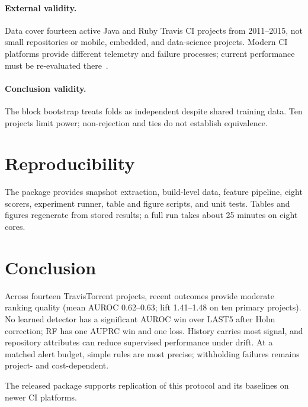 \documentclass[sigconf,review,anonymous,nonacm]{acmart}
\begin{document}
\paragraph{External validity.} Data cover fourteen active Java and Ruby Travis CI projects from 2011--2015, not small repositories or mobile, embedded, and data-science projects. Modern CI platforms provide different telemetry and failure processes; current performance must be re-evaluated there~\cite{decan2022actions, sun2024ravenbuild}.

\paragraph{Conclusion validity.} The block bootstrap treats folds as independent despite shared training data. Ten projects limit power; non-rejection and ties do not establish equivalence.

\section{Reproducibility}
\label{sec:repro}

The package provides snapshot extraction, build-level data, feature pipeline, eight scorers, experiment runner, table and figure scripts, and unit tests. Tables and figures regenerate from stored results; a full run takes about 25 minutes on eight cores.

\section{Conclusion}
\label{sec:conclusion}

Across fourteen TravisTorrent projects, recent outcomes provide moderate ranking quality (mean AUROC 0.62--0.63; lift 1.41--1.48 on ten primary projects). No learned detector has a significant AUROC win over LAST5 after Holm correction; RF has one AUPRC win and one loss. History carries most signal, and repository attributes can reduce supervised performance under drift. At a matched alert budget, simple rules are most precise; withholding failures remains project- and cost-dependent.

The released package supports replication of this protocol and its baselines on newer CI platforms.
\end{document}
